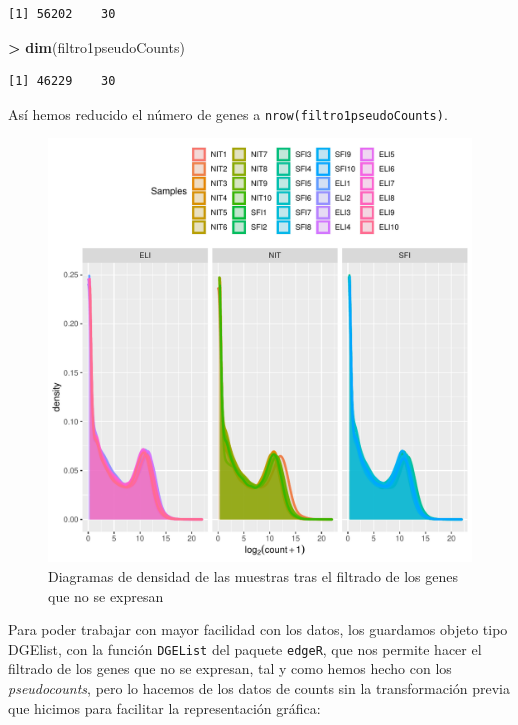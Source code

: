 \documentclass[
  english,
]{article}
\newenvironment{Shaded}{\begin{snugshade}}{\end{snugshade}}
\newcommand{\KeywordTok}[1]{\textcolor[rgb]{0.13,0.29,0.53}{\textbf{#1}}}
\newcommand{\NormalTok}[1]{#1}
\newcommand{\OperatorTok}[1]{\textcolor[rgb]{0.81,0.36,0.00}{\textbf{#1}}}
\newcommand{\StringTok}[1]{\textcolor[rgb]{0.31,0.60,0.02}{#1}}
\begin{document}
\begin{verbatim}
[1] 56202    30
\end{verbatim}

\begin{Shaded}
\begin{Highlighting}[]
\OperatorTok{>}\StringTok{ }\KeywordTok{dim}\NormalTok{(filtro1pseudoCounts)}
\end{Highlighting}
\end{Shaded}

\begin{verbatim}
[1] 46229    30
\end{verbatim}

Así hemos reducido el número de genes a
\texttt{nrow(filtro1pseudoCounts)}.

\begin{figure}
\centering
\includegraphics{ortega_rita_ADO_PEC2_files/figure-latex/density_plot_filtro1-1.pdf}
\caption{Diagramas de densidad de las muestras tras el filtrado de los
genes que no se expresan}
\end{figure}

Para poder trabajar con mayor facilidad con los datos, los guardamos
objeto tipo DGElist, con la función \texttt{DGEList} del paquete
\texttt{edgeR}, que nos permite hacer el filtrado de los genes que no se
expresan, tal y como hemos hecho con los \emph{pseudocounts}, pero lo
hacemos de los datos de counts sin la transformación previa que hicimos
para facilitar la representación gráfica:
\end{document}
